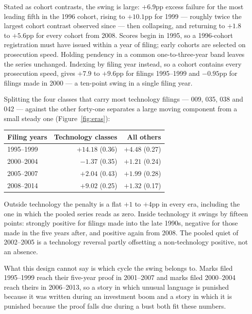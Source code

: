 Stated as cohort contrasts, the swing is large: $+6.9$pp excess failure
for the most leading fifth in the 1996 cohort, rising to $+10.1$pp for
1999 --- roughly twice the largest cohort contrast observed since ---
then collapsing, and returning to $+1.8$ to $+5.6$pp for every cohort
from 2008. Scores begin in 1995, so a 1996-cohort registration must have
issued within a year of filing; early cohorts are selected on prosecution
speed. Holding pendency in a common one-to-three-year band leaves the
series unchanged. Indexing by filing year instead, so a cohort contains
every prosecution speed, gives $+7.9$ to $+9.6$pp for filings 1995--1999
and $-0.95$pp for filings made in 2000 --- a ten-point swing in a single
filing year.

Splitting the four classes that carry most technology filings --- 009,
035, 038 and 042 --- against the other forty-one separates a large moving
component from a small steady one (Figure~\ref{fig:eras}):

\begin{center}\small
\begin{tabular}{lrr}
\toprule
Filing years & Technology classes & All others \\
\midrule
1995--1999 & $+14.18$ (0.36) & $+4.48$ (0.27) \\
2000--2004 & $-1.37$ (0.35) & $+1.21$ (0.24) \\
2005--2007 & $+2.04$ (0.43) & $+1.99$ (0.28) \\
2008--2014 & $+9.02$ (0.25) & $+1.32$ (0.17) \\
\bottomrule
\end{tabular}
\end{center}

\noindent Outside technology the penalty is a flat $+1$ to $+4$pp in
every era, including the one in which the pooled series reads as zero.
Inside technology it swings by fifteen points: strongly positive for
filings made into the late 1990s, negative for those made in the five
years after, and positive again from 2008. The pooled quiet of 2002--2005
is a technology reversal partly offsetting a non-technology positive, not
an absence.

What this design cannot say is which cycle the swing belongs to. Marks
filed 1995--1999 reach their five-year proof in 2001--2007 and marks
filed 2000--2004 reach theirs in 2006--2013, so a story in which unusual
language is punished because it was written during an investment boom and
a story in which it is punished because the proof falls due during a bust
both fit these numbers.

